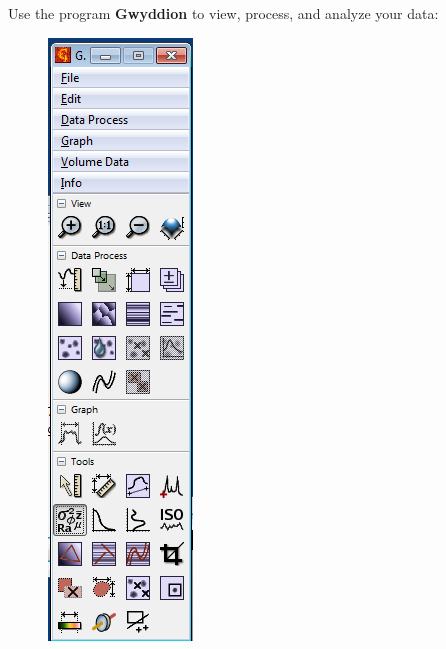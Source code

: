 \documentclass{../lab}
\begin{document}
Use the program \textbf{Gwyddion }to view, process, and analyze your data:
\begin{figure}[h]
    \centering
    \href{http://dev-physicsadv.pantheon.berkeley.edu/sites/default/files/AFMImages/39.png}{\includegraphics[width=0.5\linewidth]{images/39.png}}
    \caption{}
    \label{fig:39}
\end{figure}
\end{document}
